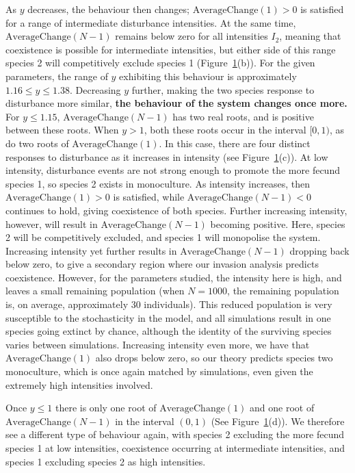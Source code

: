 \documentclass[preprint,10pt,reqno]{report}
\begin{document}
\begin{figure}[htbp]
\label{linked}
\end{figure}

As $y$ decreases, the behaviour then changes; $\text{AverageChange}(1)>0$ is satisfied for a range of intermediate disturbance intensities. At the same time, $\text{AverageChange}(N-1)$ remains below zero for all intensities $I_2$, meaning that coexistence is possible for intermediate intensities, but either side of this range species 2 will competitively exclude species 1 (Figure~\ref{linked}(b)). For the given parameters, the range of $y$ exhibiting this behaviour is approximately $1.16 \leq y \leq 1.38$. Decreasing $y$ further, making the two species response to disturbance more similar, \textbf{the behaviour of the system changes once more.} For $y\leq 1.15$, $\text{AverageChange}(N-1)$ has two real roots, and is positive between these roots. When $y>1$, both these roots occur in the interval $[0,1)$, as do two roots of $\text{AverageChange}(1)$. In this case, there are four distinct responses to disturbance as it increases in intensity (see Figure~\ref{linked}(c)). At low intensity, disturbance events are not strong enough to promote the more fecund species 1, so species 2 exists in monoculture. As intensity increases, then $\text{AverageChange}(1)>0$ is satisfied, while $\text{AverageChange}(N-1)<0$ continues to hold, giving coexistence of both species. Further increasing intensity, however, will result in $\text{AverageChange}(N-1)$ becoming positive. Here, species 2 will be competitively excluded, and species 1 will monopolise the system. Increasing intensity yet further results in $\text{AverageChange}(N-1)$ dropping back below zero, to give a secondary region where our invasion analysis predicts coexistence. However, for the parameters studied, the intensity here is high, and leaves a small remaining population (when $N=1000$, the remaining population is, on average, approximately 30 individuals). This reduced population is very susceptible to the stochasticity in the model, and all simulations result in one species going extinct by chance, although the identity of the surviving species varies between simulations. Increasing intensity even more, we have that $\text{AverageChange}(1)$ also drops below zero, so our theory predicts species two monoculture, which is once again matched by simulations, even given the extremely high intensities involved.

Once $y\leq 1$ there is only one root of $\text{AverageChange}(1)$ and one root of $\text{AverageChange}(N-1)$ in the interval $(0,1)$ (See Figure~\ref{linked}(d)). We therefore see a different type of behaviour again, with species 2 excluding the more fecund species 1 at low intensities, coexistence occurring at intermediate intensities, and species 1 excluding species 2 as high intensities.
\end{document}
